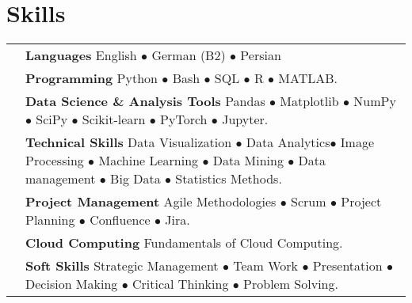 \documentclass[oneside]{article}
\begin{document}
{\begin{minipage}[t][\textheight-2\fboxsep-2\fboxrule][t]{\dimexpr0.41\textwidth-2\fboxrule-2\fboxsep\relax}
        \section*{\large Skills}
        
        \begin{tabularx}{\textwidth}{@{}lX@{}} %
            \faLanguage{}   & \textbf{\footnotesize Languages} \newline English  $\bullet$  German (B2) $\bullet$ Persian \\
            
            \faCode{}        & \textbf{\footnotesize Programming} \newline Python $\bullet$ Bash $\bullet$ SQL $\bullet$  R $\bullet$ MATLAB. \\
            
            \faLaptopCode{}  & \textbf{\footnotesize Data Science \& Analysis Tools} \newline Pandas $\bullet$ Matplotlib $\bullet$  NumPy $\bullet$ SciPy $\bullet$ Scikit-learn $\bullet$ PyTorch $\bullet$ Jupyter. \\
            
            \faCogs{}        & \textbf{\footnotesize Technical Skills} \newline Data Visualization $\bullet$ Data Analytics$\bullet$ Image Processing $\bullet$ Machine Learning $\bullet$ Data Mining $\bullet$ Data management $\bullet$ Big Data $\bullet$ Statistics Methods. \\ %
            
            \faToolbox{}     & \textbf{\footnotesize Project Management} \newline Agile Methodologies $\bullet$ Scrum $\bullet$ Project Planning $\bullet$ Confluence $\bullet$ Jira. \\
            
            \faCloud{}       & \textbf{\footnotesize Cloud Computing}  \newline Fundamentals of Cloud Computing.%
            \\
        
            \faUsers{}       & \textbf{\footnotesize Soft Skills} \newline Strategic Management $\bullet$ Team Work $\bullet$ Presentation $\bullet$ Decision Making $\bullet$ Critical Thinking $\bullet$ Problem Solving. \\
        \end{tabularx}

        \vspace{1pt}
        
    \end{minipage}
}
\end{document}
